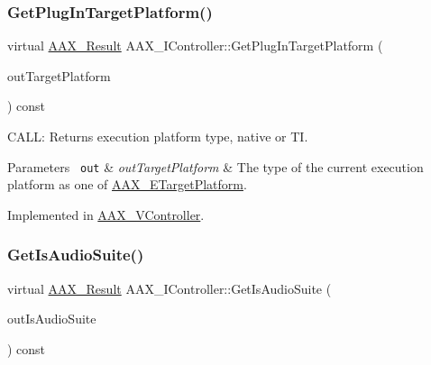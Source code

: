 \subsubsection{\texorpdfstring{GetPlugInTargetPlatform()}{GetPlugInTargetPlatform()}}
{\footnotesize\ttfamily virtual \mbox{\hyperlink{a00392_a4d8f69a697df7f70c3a8e9b8ee130d2f}{A\+A\+X\+\_\+\+Result}} A\+A\+X\+\_\+\+I\+Controller\+::\+Get\+Plug\+In\+Target\+Platform (\begin{DoxyParamCaption}\item[{\mbox{\hyperlink{a00392_a8f2cefa455217fa9f3ce190fe5fd8033}{A\+A\+X\+\_\+\+C\+Target\+Platform}} $\ast$}]{out\+Target\+Platform }\end{DoxyParamCaption}) const\hspace{0.3cm}{\ttfamily [pure virtual]}}



C\+A\+LL\+: Returns execution platform type, native or TI. 


\begin{DoxyParams}[1]{Parameters}
\mbox{\texttt{ out}}  & {\em out\+Target\+Platform} & The type of the current execution platform as one of \mbox{\hyperlink{a00491_a19e8cc27f59bb9bb4039b00fadb3cb83}{A\+A\+X\+\_\+\+E\+Target\+Platform}}. \\
\hline
\end{DoxyParams}


Implemented in \mbox{\hyperlink{a01905_abb34f17e64d4e50ac8cabf8f47639994}{A\+A\+X\+\_\+\+V\+Controller}}.

\mbox{\label{a01789_af6d44bc336c3c2e4cca1a1684b556db3}} 
\subsubsection{\texorpdfstring{GetIsAudioSuite()}{GetIsAudioSuite()}}
{\footnotesize\ttfamily virtual \mbox{\hyperlink{a00392_a4d8f69a697df7f70c3a8e9b8ee130d2f}{A\+A\+X\+\_\+\+Result}} A\+A\+X\+\_\+\+I\+Controller\+::\+Get\+Is\+Audio\+Suite (\begin{DoxyParamCaption}\item[{\mbox{\hyperlink{a00392_aa216506530f1d19a2965931ced2b274b}{A\+A\+X\+\_\+\+C\+Boolean}} $\ast$}]{out\+Is\+Audio\+Suite }\end{DoxyParamCaption}) const\hspace{0.3cm}{\ttfamily [pure virtual]}}



